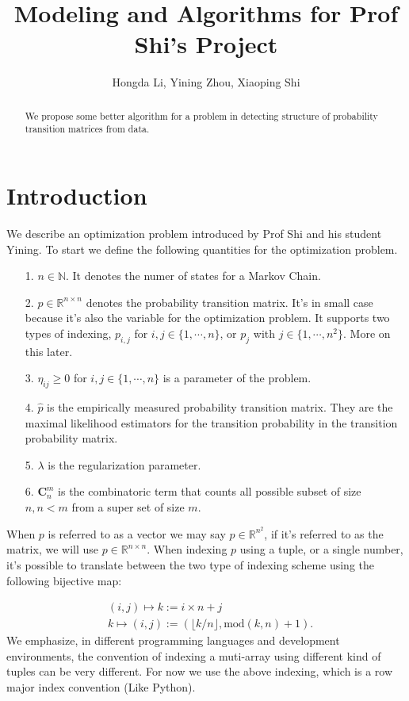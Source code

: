 \documentclass[11pt]{article}
\title{Modeling and Algorithms for Prof Shi's Project}
\author{Hongda Li, Yining Zhou, Xiaoping Shi}
\theoremstyle{definition}
\numberwithin{equation}{subsection}
\begin{document}
\internallinenumbers


\maketitle

\begin{abstract}
    We propose some better algorithm for a problem in detecting structure of probability transition matrices from data. 
\end{abstract}


\section{Introduction}
    We describe an optimization problem introduced by Prof Shi and his student Yining. 
    To start we define the following quantities for the optimization problem. 
    \begin{itemize}
        \item [1.] $n\in \mathbb N$. It denotes the numer of states for a Markov Chain. 
        \item [2.] $p\in \mathbb R^{n\times n}$ denotes the probability transition matrix. It's in small case because it's also the variable for the optimization problem. It supports two types of indexing, $p_{i,j}$ for $i, j \in \{1, \cdots, n\}$, or $p_j$ with $j\in \{1, \cdots, n^2\}$. More on this later. 
        \item [3.] $\eta_{ij} \ge 0$ for $i, j \in \{1, \cdots, n\}$ is a parameter of the problem. 
        \item [4.] $\hat p$ is the empirically measured probability transition matrix. They are the maximal likelihood estimators for the transition probability in the transition probability matrix. 
        \item [5.] $\lambda$ is the regularization parameter. 
        \item [6.] $\mathbf C^m_n$ is the combinatoric term that counts all possible subset of size $n, n<m$ from a super set of size $m$. 
    \end{itemize}
    \par
\begin{linenumbers}
    When $p$ is referred to as a vector we may say $p \in \mathbb R^{n^2}$, if it's referred to as the matrix, we will use $p \in \mathbb R^{n\times n}$. 
    When indexing $p$ using a tuple, or a single number, it's possible to translate between the two type of indexing scheme using the following bijective map: 
\end{linenumbers}
    \begin{align*}
        & (i, j) \mapsto k:= i \times n + j
        \\
        & k \mapsto (i, j) := (
            \lfloor k/n\rfloor, \text{mod}(k, n) + 1
        ). 
    \end{align*}
    We emphasize, in different programming languages and development environments, the convention of indexing a muti-array using different kind of tuples can be very different. 
    For now we use the above indexing, which is a row major index convention (Like Python). 
\end{document}
